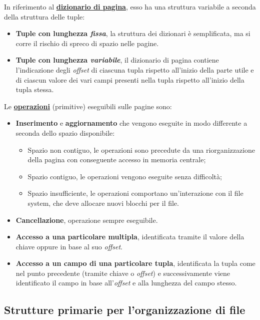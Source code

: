 \documentclass[a4paper]{article}
\begin{document}
	\noindent
	In riferimento al \textbf{\underline{dizionario di pagina}}, esso ha una struttura variabile a seconda della struttura delle tuple:
	\begin{itemize}
		\item \textbf{Tuple con lunghezza \emph{fissa}}, la struttura dei dizionari è semplificata, ma si corre il rischio di spreco di spazio nelle pagine.

		\item \textbf{Tuple con lunghezza \emph{variabile}}, il dizionario di pagina contiene l'indicazione degli \emph{offset} di ciascuna tupla rispetto all'inizio della parte utile e di ciascun valore dei vari campi presenti nella tupla rispetto all'inizio della tupla stessa.
	\end{itemize}
	Le \textbf{\underline{operazioni}} (primitive) eseguibili sulle pagine sono:
	\begin{itemize}
		\item \textbf{Inserimento} e \textbf{aggiornamento} che vengono eseguite in modo differente a seconda dello spazio disponibile:
		\begin{itemize}
			\item Spazio non contiguo, le operazioni sono precedute da una riorganizzazione della pagina con conseguente accesso in memoria centrale;
			\item Spazio contiguo, le operazioni vengono eseguite senza difficoltà;
			\item Spazio insufficiente, le operazioni comportano un'interazione con il file system, che deve allocare nuovi blocchi per il file.
		\end{itemize}

		\item \textbf{Cancellazione}, operazione sempre eseguibile.
		\item \textbf{Accesso a una particolare multipla}, identificata tramite il valore della chiave oppure in base al suo \emph{offset}.
		\item \textbf{Accesso a un campo di una particolare tupla}, identificata la tupla come nel punto precedente (tramite chiave o \emph{offset}) e successivamente viene identificato il campo in base all'\emph{offset} e alla lunghezza del campo stesso.
	\end{itemize}\newpage

	\subsection{Strutture primarie per l'organizzazione di file}
\end{document}
